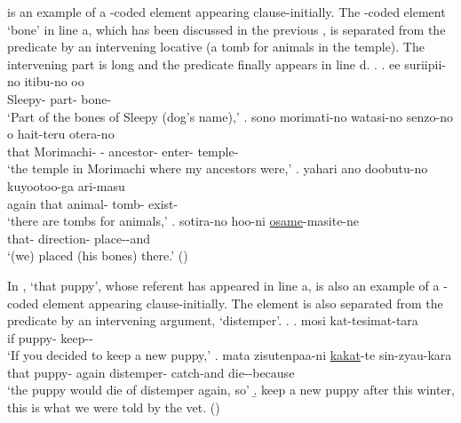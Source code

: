 \Next is an example of a -coded element appearing clause-initially.
The -coded element  `bone' in line a,
which has been discussed in the previous ,
is separated from the predicate by an intervening locative (a tomb for animals in the temple).
The intervening part is long and the predicate finally appears in line d.
%
\ex.
	\ag. ee suriipii-no itibu-no oo  \\
		 Sleepy- part-  bone- \\
		`Part of the bones of Sleepy (dog's name),'
	\bg. sono morimati-no watasi-no senzo-no o hait-teru otera-no \\
		that Morimachi- - ancestor-  enter- temple- \\
		`the temple in Morimachi where my ancestors were,'
	\bg. yahari ano doobutu-no kuyootoo-ga ari-masu \\
		again that animal- tomb- exist- \\
		`there are tombs for animals,'
	\bg. sotira-no hoo-ni \ul{osame}-masite-ne \\
		that- direction- place--and \\
		`(we) placed (his bones) there.'
	\hfill{()}

In \Next,
 `that puppy',
whose referent has appeared in line a,
is also an example of a -coded element appearing clause-initially.
The element is also separated from the predicate
by an intervening argument, `distemper'.
%
\ex.
	\ag. mosi  kat-tesimat-tara \\
		if puppy- keep-- \\
		`If you decided to keep a new puppy,'
	\bg.   mata zisutenpaa-ni \ul{kakat}-te sin-zyau-kara \\
			that puppy- again distemper- catch-and die--because \\
			`the puppy would die of distemper again, so'
	\b. keep a new puppy after this winter, this is what we were told by the vet.
	\hfill{()}
%

